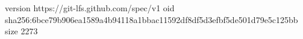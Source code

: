 version https://git-lfs.github.com/spec/v1
oid sha256:6bce79b906ea1589a4b94118a1bbac11592df8df5d3efbf5de501d79e5c125bb
size 2273
